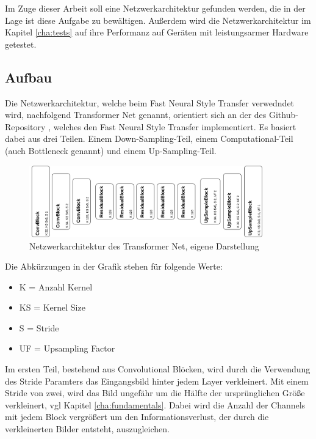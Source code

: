 Im Zuge dieser Arbeit soll eine Netzwerkarchitektur gefunden werden, die in der Lage ist diese Aufgabe zu bewältigen. Außerdem wird die Netzwerkarchitektur im Kapitel \ref{cha:tests} auf ihre Performanz auf Geräten mit leistungsarmer Hardware getestet.

\subsection{Aufbau}
\label{sec:aufbau}

Die Netzwerkarchitektur, welche beim Fast Neural Style Transfer verwedndet wird, nachfolgend Transformer Net genannt, orientiert sich an der des Github-Repository \cite{PyTorchFastNeuralStyle}, welches den Fast Neural Style Transfer implementiert.
Es basiert dabei aus drei Teilen. Einem Down-Sampling-Teil, einem Computational-Teil (auch Bottleneck genannt) und einem Up-Sampling-Teil.

\begin{figure}[H]
	\centering
	\includegraphics[width=0.90\textwidth]{resources/content/transformer_net.png}
	\caption{Netzwerkarchitektur des Transformer Net, eigene Darstellung}
	\label{img:transformer_net_img}
\end{figure}

Die Abkürzungen in der Grafik stehen für folgende Werte:

\begin{itemize}
	\item K = Anzahl Kernel
	\item KS = Kernel Size
	\item S = Stride
	\item UF = Upsampling Factor
\end{itemize}

Im ersten Teil, bestehend aus Convolutional Blöcken, wird durch die Verwendung des Stride Paramters das Eingangsbild hinter jedem Layer verkleinert.
Mit einem Stride von zwei, wird das Bild ungefähr um die Hälfte der ursprünglichen Größe verkleinert, vgl Kapitel \ref{cha:fundamentals}. Dabei wird die Anzahl der Channels mit jedem Block vergrößert um den Informationsverlust, der durch die verkleinerten Bilder entsteht, auszugleichen.

